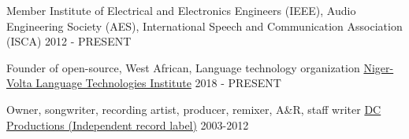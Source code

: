 

\begin{cventries}
	
  \cventry
    {Member} %
    {Institute of Electrical and Electronics Engineers (IEEE), Audio Engineering Society (AES), International Speech and Communication Association (ISCA)} %
    {} %
    {2012 - PRESENT} %
    {}

  \cventry
    {Founder of open-source, West African, Language technology organization} %
    {\href{https://github.com/Niger-Volta-LTI}{Niger-Volta Language Technologies Institute}} %
    {} %
    {2018 - PRESENT} %
    {}


%    
  \cventry
    {Owner, songwriter, recording artist, producer, remixer, A\&R, staff writer} %
    {\href{http://www.discogs.com/label/43535-Defchild-Productions}{DC Productions (Independent record label)}} %
    {} %
    {2003-2012} %
    {}
	
\end{cventries}
